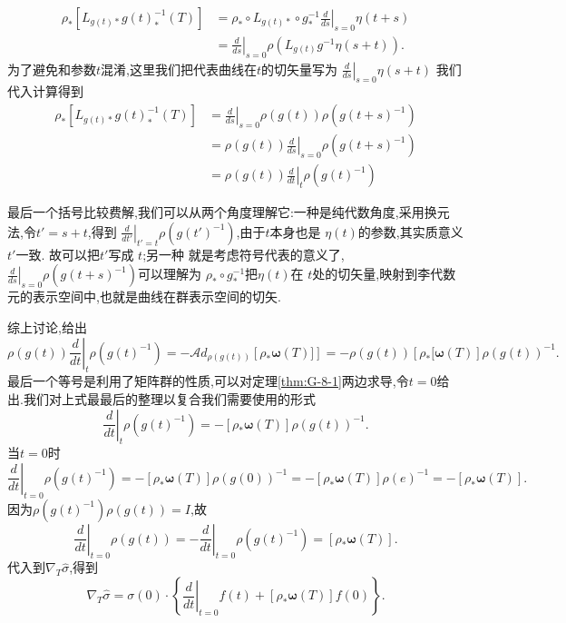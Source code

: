 \documentclass[../main.tex]{subfiles}
\begin{document}
\begin{align*}
  \rho_*[L_{g(t)*} g(t)^{-1}_*(T)] &= \rho_*\circ L_{g(t)*}\circ g^{-1}_*  \left.\frac{d}{d s}\right|_{s = 0} \eta(t+s)\\
                                   & = \left.\frac{d}{d s}\right|_{s = 0} \rho (L_{g(t)} g^{-1}\eta(s+t))
.\end{align*}
为了避免和参数$t$混淆,这里我们把代表曲线在$t$的切矢量写为 $\left.\frac{d}{ds}\right|_{s = 0} \eta(s+t)$
我们代入计算得到
\begin{align*}
  \rho_*[L_{g(t)*} g(t)^{-1}_*(T)]  &= \left.\frac{d}{d s}\right|_{s = 0} \rho(g(t)) \rho(g(t+s)^{-1})\\
                                    & =\rho(g(t)) \left.\frac{d}{d s}\right|_{s = 0}  \rho(g(t+s)^{-1})\\
                                    &=\rho(g(t)) \left.\frac{d}{d t}\right|_{t}  \rho(g(t)^{-1}) 
\end{align*}
\begin{note}
  最后一个括号比较费解,我们可以从两个角度理解它:一种是纯代数角度,采用换元法,令$t' = s+t$,得到 $\left.\frac{d}{d t'}\right|_{t' = t}  \rho(g(t')^{-1})$,由于$t$本身也是 $\eta(t)$的参数,其实质意义$t'$一致. 故可以把$t'$写成 $t$;另一种
    就是考虑符号代表的意义了,$\left.\frac{d}{d s}\right|_{s = 0}  \rho(g(t+s)^{-1})$可以理解为 $\rho_* \circ g^{-1}_*$把$\eta(t)$在 $t$处的切矢量,映射到李代数元的表示空间中,也就是曲线在群表示空间的切矢.
\end{note}
综上讨论,给出
\[
  \rho(g(t)) \left.\frac{d}{d t} \right|_{t}  \rho(g(t)^{-1}) = -\mathscr{A}\!d_{\rho(g(t))}\left[ \rho_* \bm{\omega}(T) ] \right] = -\rho(g(t)) \left[ \rho_* [\bm{\omega}(T) \right]\rho(g(t))^{-1}
.\] 
最后一个等号是利用了矩阵群的性质,可以对定理\ref{thm:G-8-1}两边求导,令$t = 0$给出.我们对上式最最后的整理以复合我们需要使用的形式\[
\left.\frac{d}{d t} \right|_{t}  \rho(g(t)^{-1}) = -\left[ \rho_* \bm{\omega}(T) \right]\rho(g(t))^{-1}
.\] 
当$t = 0$时 \[
\left.\frac{d}{d t} \right|_{t = 0}  \rho(g(t)^{-1}) = -\left[ \rho_* \bm{\omega}(T) \right]\rho(g(0))^{-1} = -\left[ \rho_* \bm{\omega}(T) \right]\rho\left( e \right) ^{-1}= -\left[ \rho_* \bm{\omega}(T) \right]
.\] 
因为$\rho(g(t)^{-1}) \rho(g(t)) = I$,故\[
\left.\frac{d}{d t} \right|_{t = 0}  \rho(g(t)) = - \left.\frac{d}{d t} \right|_{t = 0}  \rho(g(t)^{-1}) = \left[ \rho_* \bm{\omega}(T) \right]
.\] 
代入到$\nabla_T \hat{\sigma}$,得到
\begin{equation}
  \label{eq:I-9-1}
  \nabla_T \hat{\sigma} = \sigma(0)  \cdot \left\{ \left.\frac{d}{dt}\right|_{t = 0} f(t)  + \left[ \rho_* \bm{\omega}(T) \right] f(0)\right\}  
  .\end{equation}
\end{document}

